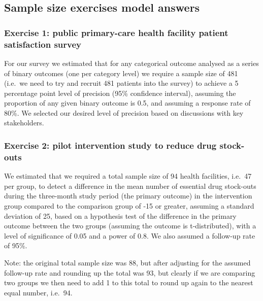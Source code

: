 \documentclass[
]{book}
\begin{document}
\hypertarget{sample-size-exercises-model-answers}{%
\subsection{Sample size exercises model answers}\label{sample-size-exercises-model-answers}}

\hypertarget{exercise-1-public-primary-care-health-facility-patient-satisfaction-survey}{%
\subsubsection{Exercise 1: public primary-care health facility patient satisfaction survey}\label{exercise-1-public-primary-care-health-facility-patient-satisfaction-survey}}

For our survey we estimated that for any categorical outcome analysed as a series of binary outcomes (one per category level) we require a sample size of 481 (i.e.~we need to try and recruit 481 patients into the survey) to achieve a 5 percentage point level of precision (95\% confidence interval), assuming the proportion of any given binary outcome is 0.5, and assuming a response rate of 80\%. We selected our desired level of precision based on discussions with key stakeholders.

\hypertarget{exercise-2-pilot-intervention-study-to-reduce-drug-stock-outs}{%
\subsubsection{Exercise 2: pilot intervention study to reduce drug stock-outs}\label{exercise-2-pilot-intervention-study-to-reduce-drug-stock-outs}}

We estimated that we required a total sample size of 94 health facilities, i.e.~47 per group, to detect a difference in the mean number of essential drug stock-outs during the three-month study period (the primary outcome) in the intervention group compared to the comparison group of -15 or greater, assuming a standard deviation of 25, based on a hypothesis test of the difference in the primary outcome between the two groups (assuming the outcome is t-distributed), with a level of significance of 0.05 and a power of 0.8. We also assumed a follow-up rate of 95\%.

Note: the original total sample size was 88, but after adjusting for the assumed follow-up rate and rounding up the total was 93, but clearly if we are comparing two groups we then need to add 1 to this total to round up again to the nearest equal number, i.e.~94.
\end{document}
